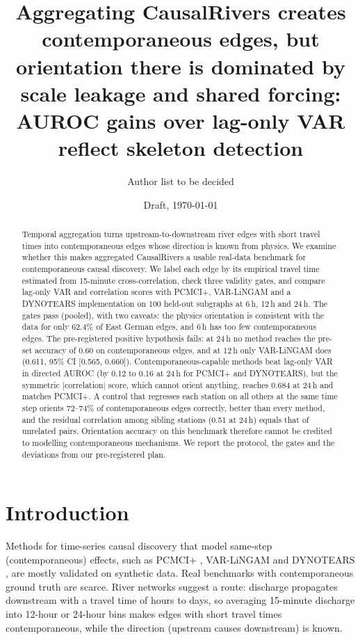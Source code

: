 \documentclass[10pt,a4paper]{article}
\title{Aggregating CausalRivers creates contemporaneous edges, but orientation there is dominated by scale leakage and shared forcing: AUROC gains over lag-only VAR reflect skeleton detection}
\author{Author list to be decided}
\date{Draft, \today}
\begin{document}
\maketitle

\begin{abstract}
Temporal aggregation turns upstream-to-downstream river edges with short travel times into contemporaneous edges whose direction is known from physics. We examine whether this makes aggregated CausalRivers a usable real-data benchmark for contemporaneous causal discovery. We label each edge by its empirical travel time estimated from 15-minute cross-correlation, check three validity gates, and compare lag-only VAR and correlation scores with PCMCI+, VAR-LiNGAM and a DYNOTEARS implementation on 100 held-out subgraphs at 6\,h, 12\,h and 24\,h. The gates pass (pooled), with two caveats: the physics orientation is consistent with the data for only 62.4\% of East German edges, and 6\,h has too few contemporaneous edges. The pre-registered positive hypothesis fails: at 24\,h no method reaches the pre-set accuracy of 0.60 on contemporaneous edges, and at 12\,h only VAR-LiNGAM does (0.611, 95\% CI [0.565, 0.660]). Contemporaneous-capable methods beat lag-only VAR in directed AUROC (by 0.12 to 0.16 at 24\,h for PCMCI+ and DYNOTEARS), but the symmetric $|$correlation$|$ score, which cannot orient anything, reaches 0.684 at 24\,h and matches PCMCI+. A control that regresses each station on all others at the same time step orients 72--74\% of contemporaneous edges correctly, better than every method, and the residual correlation among sibling stations (0.51 at 24\,h) equals that of unrelated pairs. Orientation accuracy on this benchmark therefore cannot be credited to modelling contemporaneous mechanisms. We report the protocol, the gates and the deviations from our pre-registered plan.
\end{abstract}

\section{Introduction}
Methods for time-series causal discovery that model same-step (contemporaneous) effects, such as PCMCI+ \citep{runge2020pcmciplus}, VAR-LiNGAM \citep{hyvarinen2010svar} and DYNOTEARS \citep{pamfil2020dynotears}, are mostly validated on synthetic data. Real benchmarks with contemporaneous ground truth are scarce. River networks suggest a route: discharge propagates downstream with a travel time of hours to days, so averaging 15-minute discharge into 12-hour or 24-hour bins makes edges with short travel times contemporaneous, while the direction (upstream causes downstream) is known.
\end{document}
